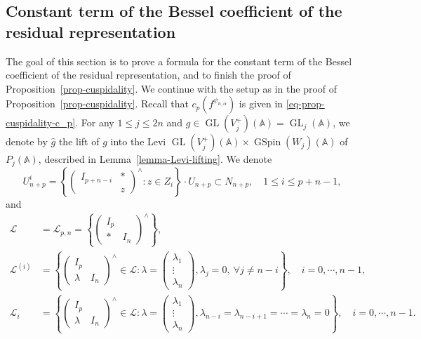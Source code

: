 \documentclass[12pt]{amsart}
\newcommand{\A}{\mathbb{A}}
\theoremstyle{remark}
\DeclareMathOperator{\GL}{GL}
\DeclareMathOperator{\GSpin}{GSpin}
\begin{document}
\subsection{Constant term of the Bessel coefficient of the residual representation}
The goal of this section is to prove a formula for the constant term of the Bessel coefficient of the residual representation, and to finish the proof of Proposition~\ref{prop-cuspidality}. We continue with the setup as in the proof of  Proposition~\ref{prop-cuspidality}.
Recall that $c_p(f^{\psi_{n,\alpha}})$ is given in \eqref{eq-prop-cuspidality-c_p}.
For any $1\le j \le 2n$ and $g\in \GL(V_j^+)(\A)=\GL_j(\A)$, we denote by $\hat{g}$ the lift of $g$ into the Levi $\GL(V_j^+)(\A)\times\GSpin(W_j)(\A)$ of $P_j(\A)$, described in Lemma~\ref{lemma-Levi-lifting}. 
We denote 
\begin{equation*}
U_{n+p}^i =\left\{ \begin{pmatrix} I_{p+n-i}& * \\ & z \end{pmatrix}^\wedge: z\in Z_i \right\}\cdot U_{n+p}\subset N_{n+p}, \quad 1\le i \le p+n-1,
\end{equation*}
and
\begin{equation*}
\begin{split}
\mathcal{L} &=\mathcal{L}_{p,n} =\left\{ \begin{pmatrix} I_p&\\ * &I_{n}\end{pmatrix}^\wedge \right\}, \\
\mathcal{L}^{(i)} &= \left\{ \begin{pmatrix} I_p&\\ \lambda &I_{n}\end{pmatrix}^\wedge \in \mathcal{L}: \lambda=\begin{pmatrix} \lambda_1 \\ \vdots \\ \lambda_n \end{pmatrix}, \lambda_j=0, \  \forall j\not=n-i \right\}, \quad i=0, \cdots, n-1,\\
\mathcal{L}_i &= \left\{ \begin{pmatrix} I_p&\\ \lambda &I_{n}\end{pmatrix}^\wedge \in \mathcal{L}: \lambda=\begin{pmatrix} \lambda_1 \\ \vdots \\ \lambda_n \end{pmatrix}, \lambda_{n-i}=\lambda_{n-i+1}=\cdots =\lambda_{n}=0 \right\}, \quad i=0, \cdots, n-1.
\end{split}
\end{equation*}
\end{document}
